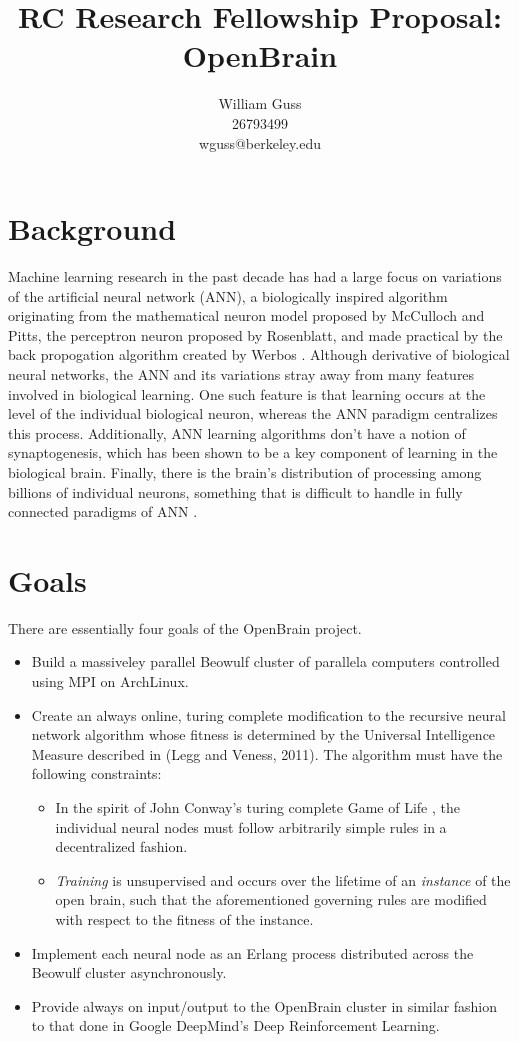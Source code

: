 \documentclass[letter]{article}
\title{RC Research Fellowship Proposal: OpenBrain}
\author{William Guss\\26793499\\wguss@berkeley.edu}
\begin{document}
\maketitle
\thispagestyle{empty}


\section{Background}
Machine learning research in the past decade has had a large focus on variations of the artificial neural network (ANN),
a biologically inspired algorithm originating from the mathematical neuron model proposed by McCulloch and Pitts\cite{mcpitts},
the perceptron neuron proposed by Rosenblatt\cite{perceptron}, and made practical by the back propogation algorithm created by Werbos \cite{bprop}.
Although derivative of biological neural networks, the ANN and its variations stray away from many features involved in biological learning. One
such feature is that learning occurs at the level of the individual biological neuron, whereas the ANN paradigm centralizes this process.
Additionally, ANN learning algorithms don't have a notion of synaptogenesis, which has been shown to be a key component of learning in the biological
brain\cite{gene}. Finally, there is the brain's distribution of processing among billions of individual neurons, something that is difficult to handle
in fully connected paradigms of ANN \cite{annbook}.

\section{Goals}
There are essentially four goals of the OpenBrain project.
\begin{itemize}
\item Build a massiveley parallel Beowulf cluster of parallela computers controlled using MPI on ArchLinux.
\item Create an always online, turing complete modification to the recursive neural network algorithm whose fitness
is determined by the Universal Intelligence Measure described in (Legg and Veness, 2011). The algorithm must have the
following constraints:
    \begin{itemize}
        \item In the spirit of John Conway's turing complete Game of Life \cite{conway}, the individual neural nodes must follow
         arbitrarily simple rules in a decentralized fashion.
        \item \emph{Training} is unsupervised and occurs over the lifetime of an \emph{instance} of the open brain,
        such that the aforementioned governing rules are modified with respect to the fitness of the instance.
    \end{itemize}
\item Implement each neural node as an Erlang process distributed across the Beowulf cluster asynchronously.
\item Provide always on input/output to the OpenBrain cluster in similar fashion to that done in Google DeepMind's
  Deep Reinforcement Learning.
\end{itemize}
\end{document}
